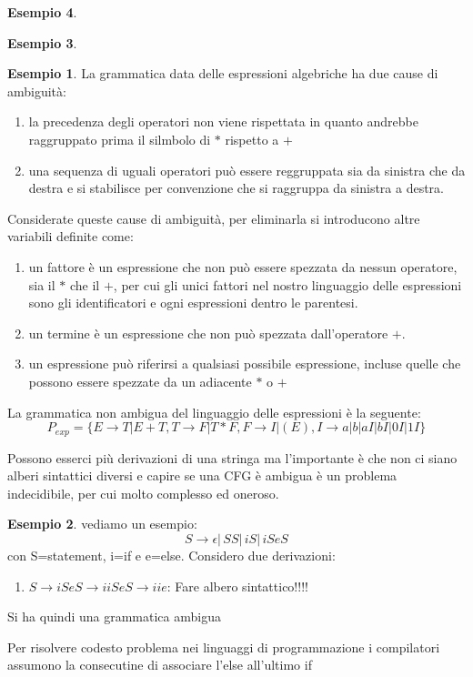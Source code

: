\documentclass[a4paper]{book}
\theoremstyle{definition}%
\newtheorem*{esempio}{Esempio}
\begin{document}
\begin{esempio}
\begin{esempio}
\begin{esempio}
La grammatica data delle espressioni algebriche ha due cause di ambiguità:
\begin{enumerate}
  \item la precedenza degli operatori non viene rispettata in quanto andrebbe raggruppato prima il silmbolo di $*$ rispetto a $+$
  \item una sequenza di uguali operatori può essere reggruppata sia da sinistra che da destra e si stabilisce per convenzione
    che si raggruppa da sinistra a destra.
\end{enumerate}
  Considerate queste cause di ambiguità, per eliminarla si introducono altre variabili definite come:
  \begin{enumerate}
  \item un fattore è un espressione che non può essere spezzata da nessun operatore, sia il $*$ che il $+$, per cui gli unici fattori
    nel nostro linguaggio delle espressioni sono gli identificatori e ogni espressioni dentro le parentesi.
  \item un termine è un espressione che non può spezzata dall'operatore $+$.
  \item un espressione può riferirsi a qualsiasi possibile espressione, incluse quelle che possono essere spezzate da un adiacente $*$ o $+$
  \end{enumerate}
  La grammatica non ambigua del linguaggio delle espressioni è la seguente:
  \begin{equation*}
    P_{exp} = \{E \to T | E + T, T \to F | T * F,F \to I | (E), I \to a | b | aI| bI | 0I | 1I\}
  \end{equation*}
\end{esempio}
Possono esserci più derivazioni di una stringa ma l'importante è che non ci siano alberi sintattici diversi e capire se una CFG è ambigua
è un problema indecidibile, per cui molto complesso ed oneroso.
\begin{esempio}
vediamo un esempio:
\[ S\to \epsilon|\,SS|\, iS|\, iSeS \]
con S=statement, i=if e e=else.
Considero due derivazioni:
\begin{enumerate}
\item $S\to iSeS\to iiSeS\to iie$:
  Fare albero sintattico!!!!
\end{enumerate}
Si ha quindi una grammatica ambigua
\end{esempio}
Per risolvere codesto problema nei linguaggi di programmazione i compilatori assumono la consecutine di associare l'else all'ultimo if 


\end{esempio}
\end{esempio}
\end{document}
